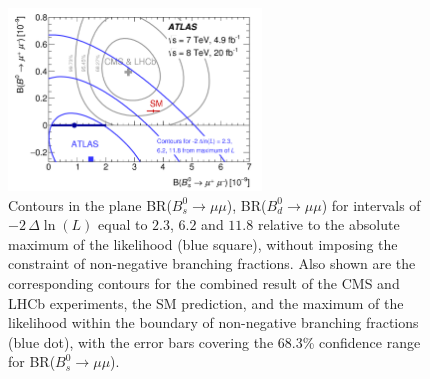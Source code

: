 \begin{figure}[!t]
  \begin{center}
    \includegraphics[width=0.6\textwidth]{fig_09.png}
    \caption
        {Contours in the plane  BR($B^0_s \to \mu \mu$), BR($B^0_d \to \mu \mu$) for intervals of
          $-2\, \Delta \ln(L)$ equal to $2.3$, $6.2$ and $11.8$ relative to the absolute maximum 
          of the likelihood (blue square), without imposing the constraint of non-negative branching fractions. 
          Also shown are the corresponding contours for the combined result of the CMS and LHCb 
          experiments, the SM prediction, and the maximum of the likelihood within the boundary of non-negative 
          branching fractions (blue dot), with the error bars covering the 68.3\% confidence range for BR($B^0_s \to \mu \mu$).}
        \label{fig:BsBd}
  \end{center}
\end{figure}
